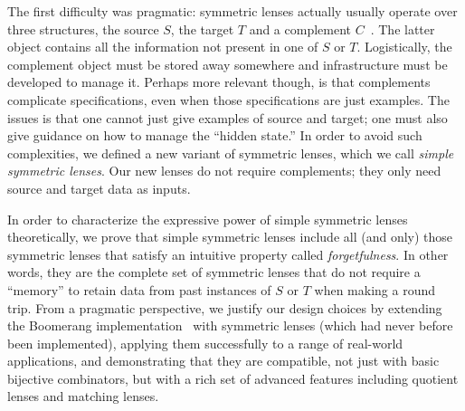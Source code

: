 \documentclass[acmsmall,screen,anonymous]{acmart}
\begin{document}
The first difficulty was pragmatic:  symmetric lenses actually
usually operate over three structures, the source $S$, the target $T$ and a
complement $C$~\cite{symmetric-lenses}.
The latter object contains all the information not present in one of $S$ or $T$.  Logistically,
the complement object must be stored away somewhere and infrastructure must be developed
to manage it.  
Perhaps more relevant though, is that complements complicate specifications, even when
those specifications are just examples.  The issues is that one cannot
just give examples of source and target; one must also give guidance on how to manage
the ``hidden state.''  In order to avoid such complexities, we defined a new
variant of symmetric lenses, which we call \emph{simple symmetric lenses}.  Our new
lenses do not require complements; they only need source and target
data as inputs. 

In order to characterize the expressive power of simple symmetric lenses
theoretically, we prove that simple symmetric lenses
include all (and only) those symmetric lenses that satisfy
an intuitive property called \emph{forgetfulness}.  In other words, they are the
complete set of symmetric lenses that do not require a ``memory'' to retain data
from past instances of $S$ or $T$ when making a round trip.
From a pragmatic perspective, we justify our design choices by extending
the Boomerang implementation~\cite{Boomerang} with symmetric lenses (which
had never before been implemented),
applying them successfully to a range of real-world applications,
and demonstrating that they are compatible, not just with basic bijective
combinators,
but with a rich set of advanced features including quotient lenses and matching lenses.
\end{document}
